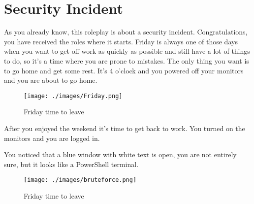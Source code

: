 \section*{Security Incident}
As you already know, this roleplay is about a security incident. Congratulations, you have received the roles where it starts.
Friday is always one of those days when you want to get off work as quickly as possible and still have a lot of things to do, so it's a time where you are prone to mistakes. 
The only thing you want is to go home and get some rest.
It's 4 o'clock and you powered off your monitors and you are about to go home.

\begin{figure}[h]
  \centering
  \texttt{[image: ./images/Friday.png]}
  \caption{Friday time to leave}
\end{figure}

After you enjoyed the weekend it's time to get back to work.
You turned on the monitors and you are logged in.

You noticed that a blue window with white text is open, you are not entirely sure, but it looks like a PowerShell terminal.

\begin{figure}[h]
  \centering
  \texttt{[image: ./images/bruteforce.png]}
  \caption{Friday time to leave}
\end{figure}
